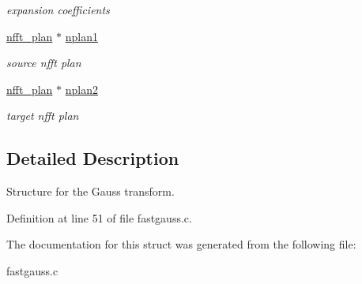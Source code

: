 \begin{CompactItemize}
\begin{CompactList}\small\item\em expansion coefficients \item\end{CompactList}\item 
\hypertarget{structfgt__plan_o12}{
\hyperlink{structnfft__plan}{nfft\_\-plan} $\ast$ \hyperlink{structfgt__plan_o12}{nplan1}}
\label{structfgt__plan_o12}

\begin{CompactList}\small\item\em source nfft plan \item\end{CompactList}\item 
\hypertarget{structfgt__plan_o13}{
\hyperlink{structnfft__plan}{nfft\_\-plan} $\ast$ \hyperlink{structfgt__plan_o13}{nplan2}}
\label{structfgt__plan_o13}

\begin{CompactList}\small\item\em target nfft plan \item\end{CompactList}\end{CompactItemize}


\subsection{Detailed Description}
Structure for the Gauss transform. 



Definition at line 51 of file fastgauss.c.

The documentation for this struct was generated from the following file:\begin{CompactItemize}
\item 
fastgauss.c\end{CompactItemize}
